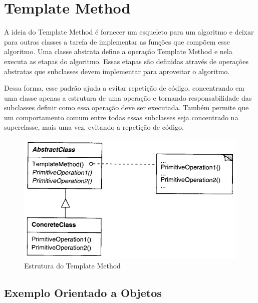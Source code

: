 \section{Template Method}

A ideia do Template Method é fornecer um esqueleto para um algoritmo 
e deixar para outras classes a tarefa de implementar as funções que 
compõem esse algoritmo. Uma classe abstrata define a operação Template 
Method e nela executa as etapas do algoritmo. Essas etapas são definidas 
através de operações abstratas que subclasses devem implementar para 
aproveitar o algoritmo.

Dessa forma, esse padrão ajuda a evitar repetição de código, concentrando 
em uma classe apenas a estrutura de uma operação e tornando responsabilidade 
das subclasses definir como essa operação deve ser executada. Também permite 
que um comportamento comum entre todas essas subclasses seja concentrado 
na superclasse, mais uma vez, evitando a repetição de código.

\begin{figure}[htb]
	\caption{\label{tpmethod_struct}Estrutura do Template Method}
	\begin{center}
	    \includegraphics[scale=0.5]{5_padroes-contexto-funcional/5.3_comportamentais/5.3.10_template-method/diagram.png}
	\end{center}
\end{figure}

\subsection*{Exemplo Orientado a Objetos}

